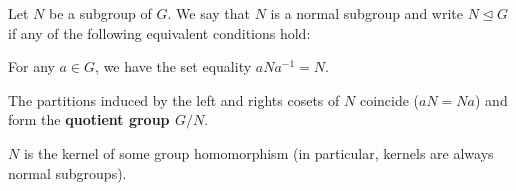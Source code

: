\begin{definition}\label{def:normal_subgroup}
  Let \( N \) be a subgroup of \( G \). We say that \( N \) is a normal subgroup and write \( N \unlhd G \) if any of the following equivalent conditions hold:
  \begin{defenum}
    \item\label{def:normal_subgroup/direct} For any \( a \in G \), we have the set equality \( a N a^{-1} = N \).
    \item\label{def:normal_subgroup/cosets} The partitions induced by the left and rights cosets of \( N \) coincide (\( aN = Na \)) and form the \textbf{quotient group \( G / N \)}.
    \item\label{def:normal_subgroup/kernel} \( N \) is the kernel of some group homomorphism (in particular, kernels are always normal subgroups).
  \end{defenum}
\end{definition}
